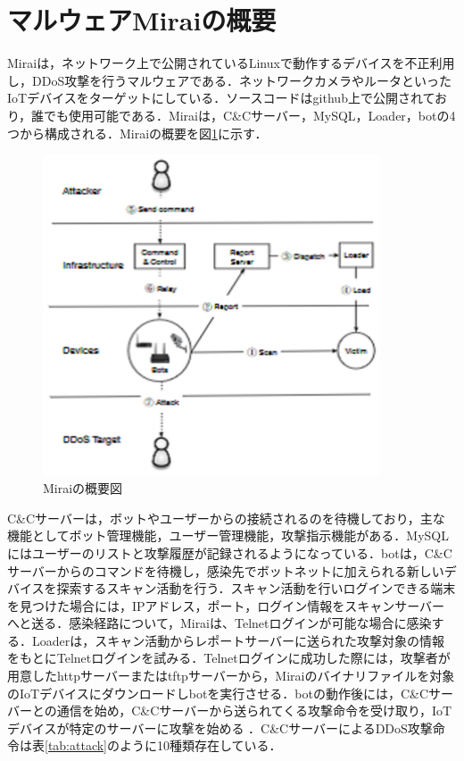 \section{マルウェアMiraiの概要}

Mirai\cite{Mirai}は，ネットワーク上で公開されているLinuxで動作するデバイスを不正利用し，DDoS攻撃を行うマルウェアである．ネットワークカメラやルータといったIoTデバイスをターゲットにしている．ソースコードはgithub\cite{code}上で公開されており，誰でも使用可能である．Miraiは，C\&Cサーバー，MySQL，Loader，botの4つから構成される．Miraiの概要を図\ref{fig:Mirai_system}に示す．

\begin{figure}[h]
   \centering
      \includegraphics[width=100mm]{figures/s.eps}
      \caption{Miraiの概要図}
   \label{fig:Mirai_system}   
\end{figure}

C\&Cサーバーは，ボットやユーザーからの接続されるのを待機しており，主な機能としてボット管理機能，ユーザー管理機能，攻撃指示機能がある．MySQLにはユーザーのリストと攻撃履歴が記録されるようになっている．botは，C\&Cサーバーからのコマンドを待機し，感染先でボットネットに加えられる新しいデバイスを探索するスキャン活動を行う．スキャン活動を行いログインできる端末を見つけた場合には，IPアドレス，ポート，ログイン情報をスキャンサーバーへと送る．感染経路について，Miraiは、Telnetログインが可能な場合に感染する．Loaderは，スキャン活動からレポートサーバーに送られた攻撃対象の情報をもとにTelnetログインを試みる．Telnetログインに成功した際には，攻撃者が用意したhttpサーバーまたはtftpサーバーから，Miraiのバイナリファイルを対象のIoTデバイスにダウンロードしbotを実行させる．botの動作後には，C\&Cサーバーとの通信を始め，C\&Cサーバーから送られてくる攻撃命令を受け取り，IoTデバイスが特定のサーバーに攻撃を始める
．C\&CサーバーによるDDoS攻撃命令は表\ref{tab:attack}のように10種類存在している．

